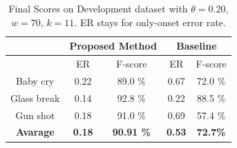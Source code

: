 \documentclass{article}
\begin{document}
\begin{sloppy}

 \begin{table}[t] 
 	\caption{Final Scores on Development dataset with $\theta=0.20$, $w=70$, $k=11$.  ER stays for only-onset error rate.}\label{tbl:finalScore} 
 	\centering 
 	\footnotesize 
 	\begin{tabular} {| c | c | c | c | c |} 
 		\hline 
 		& \multicolumn{2}{c|}{Proposed Method}&\multicolumn{2}{c|}{Baseline}\\ 
 		\hline   
 		& ER    &  F-score  & ER    &  F-score  \\   
 		\hline                                      
 		Baby cry    & 0.22  & 89.0 \%      & 0.67  & 72.0 \%\\ 
 		\hline                                      
 		Glass break & 0.14  & 92.8 \%        & 0.22  & 88.5 \%\\ 
 		\hline 
 		Gun shot    & 0.18  & 91.0 \%        & 0.69  & 57.4 \%\\ 
 		\hline 
 		\textbf{Avarage} & \textbf{0.18} & \textbf{90.91 \%}& \textbf{0.53} & \textbf{72.7\%}\\ 
 		\hline 
 		
 	\end{tabular} 
 	
 \end{table} 



\end{sloppy}
\end{document}
